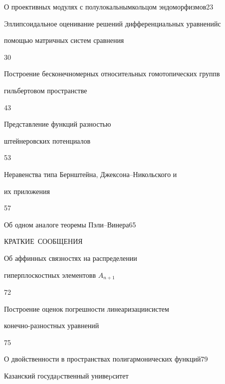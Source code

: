 

{О проективных модулях с полулокальным\newline кольцом эндоморфизмов}{23}




{Эллипсоидальное оценивание решений дифференциальных уравнений\newline с 


помощью матричных систем сравнения}{30}




{Построение бесконечномерных относительных гомотопических групп\newline в 


гильбертовом пространстве}{43}




{Представление функций разностью


штейнеровских потенциалов}{53}




{Неравенства типа Бернштейна, Джексона--Никольского и 


их приложения}{57}




{Об одном аналоге теоремы Пэли--Винера}{65}








\bigskip


\par


\centerline{\Large КРАТКИЕ~СООБЩЕНИЯ}


\bigskip







{Об аффинных связностях на распределении 


гиперплоскостных элементов\newline в $A_{n+1}$}{72}




{Построение оценок погрешности линеаризации\newline систем 


конечно-разностных уравнений}{75}




{О двойственности в пространствах полигармонических функций}{79}











\vfill


\noindent\raisebox{2pt}{\copyright} Казанский госудаpственный унивеpситет





